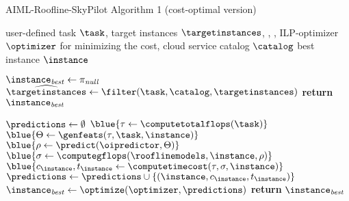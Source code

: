 \documentclass[runningheads]{llncs}
\begin{document}
\begin{algorithm}[h]
	\caption{AIML-Roofline-SkyPilot Algorithm 1 (cost-optimal version)}
	\label{alg:aiml-roofline-skypilot-1}
	\begin{algorithmic}[1]
		\Require user-defined task $\task$, target instances $\targetinstances$, , , ILP-optimizer $\optimizer$ for minimizing the cost, cloud service catalog $\catalog$
		\Ensure best instance $\instance$%
		
		\State $\instance_{\it best} \gets \pi_{\it null}$
		\State $\widehat{\targetinstances} \gets \filter(\task, \catalog, \targetinstances)$
		\If{$\widehat{\targetinstances}$ = $\emptyset$}
		\State \textbf{return} $\instance_{\it best}$
		\EndIf
		
		\State $\predictions \gets \emptyset$
		\State $\blue{\tau \gets \computetotalflops(\task)}$
		\ForAll{$\instance \in \widehat{\targetinstances}$}
		\State $\blue{\Theta \gets \genfeats(\tau, \task, \instance)}$
		\State $\blue{\rho \gets \predict(\oipredictor, \Theta)}$
		\State $\blue{\sigma \gets \computegflops(\rooflinemodels, \instance, \rho)}$
		\State $\blue{c_\instance, t_\instance \gets \computetimecost(\tau, \sigma, \instance)}$
		\State $\predictions \gets \predictions \cup \{(\instance, c_\instance, t_\instance)\}$
		\EndFor
		\State $\instance_{\it best}  \gets \optimize(\optimizer, \predictions)$
		\State \textbf{return} $\instance_{\it best}$%
	\end{algorithmic}
\end{algorithm}
\end{document}
